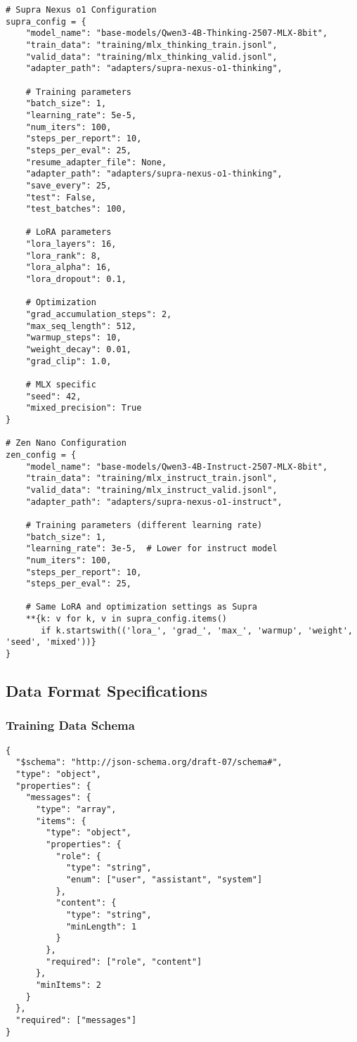 \begin{lstlisting}[caption=Complete training configuration,label=lst:training-config]
# Supra Nexus o1 Configuration
supra_config = {
    "model_name": "base-models/Qwen3-4B-Thinking-2507-MLX-8bit",
    "train_data": "training/mlx_thinking_train.jsonl",
    "valid_data": "training/mlx_thinking_valid.jsonl",
    "adapter_path": "adapters/supra-nexus-o1-thinking",
    
    # Training parameters
    "batch_size": 1,
    "learning_rate": 5e-5,
    "num_iters": 100,
    "steps_per_report": 10,
    "steps_per_eval": 25,
    "resume_adapter_file": None,
    "adapter_path": "adapters/supra-nexus-o1-thinking",
    "save_every": 25,
    "test": False,
    "test_batches": 100,
    
    # LoRA parameters
    "lora_layers": 16,
    "lora_rank": 8,
    "lora_alpha": 16,
    "lora_dropout": 0.1,
    
    # Optimization
    "grad_accumulation_steps": 2,
    "max_seq_length": 512,
    "warmup_steps": 10,
    "weight_decay": 0.01,
    "grad_clip": 1.0,
    
    # MLX specific
    "seed": 42,
    "mixed_precision": True
}

# Zen Nano Configuration  
zen_config = {
    "model_name": "base-models/Qwen3-4B-Instruct-2507-MLX-8bit", 
    "train_data": "training/mlx_instruct_train.jsonl",
    "valid_data": "training/mlx_instruct_valid.jsonl",
    "adapter_path": "adapters/supra-nexus-o1-instruct",
    
    # Training parameters (different learning rate)
    "batch_size": 1,
    "learning_rate": 3e-5,  # Lower for instruct model
    "num_iters": 100,
    "steps_per_report": 10,
    "steps_per_eval": 25,
    
    # Same LoRA and optimization settings as Supra
    **{k: v for k, v in supra_config.items() 
       if k.startswith(('lora_', 'grad_', 'max_', 'warmup', 'weight', 'seed', 'mixed'))}
}
\end{lstlisting}

\subsection{Data Format Specifications}

\subsubsection{Training Data Schema}

\begin{lstlisting}[caption=JSON schema for training data,label=lst:data-schema]
{
  "$schema": "http://json-schema.org/draft-07/schema#",
  "type": "object",
  "properties": {
    "messages": {
      "type": "array",
      "items": {
        "type": "object",
        "properties": {
          "role": {
            "type": "string",
            "enum": ["user", "assistant", "system"]
          },
          "content": {
            "type": "string",
            "minLength": 1
          }
        },
        "required": ["role", "content"]
      },
      "minItems": 2
    }
  },
  "required": ["messages"]
}
\end{lstlisting}

